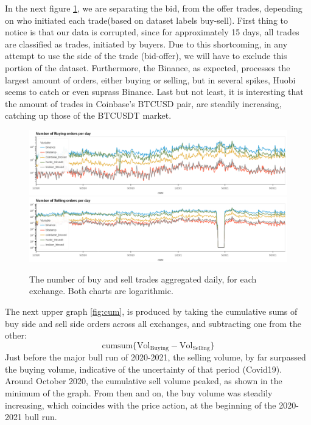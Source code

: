 \documentclass[10pt]{asme2ej}
\begin{document}
In the next figure \ref{fig:nooftrades2}, we are separating the bid, from the offer trades, depending on who initiated each trade(based on  dataset labels buy-sell). First thing to notice is that our data is corrupted, since for approximately 15 days, all trades are classified as trades, initiated by buyers. Due to this shortcoming, in any attempt to use the side of the trade (bid-offer), we will have to exclude this portion of the dataset. Furthermore, the Binance, as expected, processes the largest amount of orders, either buying or selling, but in several spikes, Huobi seems to catch or even suprass Binance. Last but not least, it is interesting that the amount of trades in Coinbase's BTCUSD pair, are steadily increasing, catching up those of the BTCUSDT market.

\begin{figure}[H]
	\centering
	\includegraphics[width=12cm, height = 2.8cm]{nosell1.png} \\
	\includegraphics[width=12cm, height = 2.8cm]{nosell2.png} \\ 
	\caption{The number of buy and sell trades aggregated daily, for each exchange. Both charts are logarithmic.}
	\label{fig:nooftrades2}
\end{figure}


The next upper graph \ref{fig:cum}, is produced by taking the cumulative sums of buy side and sell side orders across all exchanges, and subtracting one from the other: 
\[ \text{cumsum}\{\text{Vol}_{\text{Buying}} - \text{Vol}_{\text{Selling}}\} \]
Just before the major bull run of 2020-2021, the selling volume, by far surpassed the buying volume, indicative of the uncertainty of that period (Covid19). Around October 2020, the cumulative sell volume peaked, as shown in the minimum of the graph. From then and on, the buy volume was steadily increasing, which coincides with the price action, at the beginning of the 2020-2021 bull run.  
\end{document}
